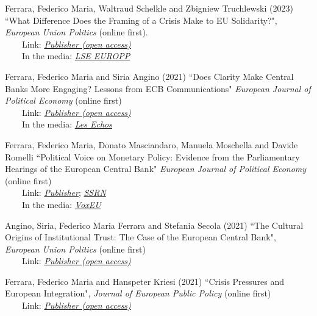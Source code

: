\documentclass[margin, line]{res}
\begin{document}
\begin{resume}
Ferrara, Federico Maria, Waltraud Schelkle and Zbigniew Truchlewski (2023) ``What Difference Does the Framing of a Crisis Make to EU Solidarity?", \textit{European Union Politics} (online first). \\ \-\ \-\ \-\ \-\ Link: \href{https://journals.sagepub.com/doi/full/10.1177/14651165231184641}{\textit{Publisher (open access)}} \\  \-\ \-\ \-\  \-\ In the media: \href{https://blogs.lse.ac.uk/europpblog/2023/09/07/whats-in-a-crisis-how-frames-change-citizens-support-for-solidarity}{\textit{LSE EUROPP}}

Ferrara, Federico Maria and Siria Angino (2021) ``Does Clarity Make Central Banks More Engaging? Lessons from ECB Communications" \textit{European Journal of Political Economy} (online first) \\ \-\ \-\ \-\ \-\ Link: \href{https://www.sciencedirect.com/science/article/pii/S0176268021001191}{\textit{Publisher (open access)}}\\ \-\ \-\ \-\  \-\ In the media: \href{https://www.lesechos.fr/finance-marches/marches-financiers/la-bce-prise-au-mot-par-les-marches-1371644" target="_blank}{\textit{Les Echos}}

Ferrara, Federico Maria, Donato Masciandaro, Manuela Moschella and Davide Romelli ``Political Voice on Monetary Policy: Evidence from the Parliamentary Hearings of the European Central Bank" \textit{European Journal of Political Economy} (online first)\\ \-\ \-\ \-\ \-\ Link: \href{https://www.sciencedirect.com/science/article/abs/pii/S0176268021001178?dgcid=rss_sd_all}{\textit{Publisher}}; \href{https://papers.ssrn.com/sol3/papers.cfm?abstract_id=3820745}{\textit{SSRN}}\\ \-\ \-\ \-\  \-\ In the media: \href{https://voxeu.org/article/parliamentary-voice-ecb-monetary-policy}{\textit{VoxEU}}

Angino, Siria, Federico Maria Ferrara and Stefania Secola (2021) ``The Cultural Origins of Institutional Trust: The Case of the European Central Bank", \textit{European Union Politics} (online first)\\ \-\ \-\ \-\ \-\ Link: \href{https://journals.sagepub.com/doi/10.1177/14651165211048325}{\textit{Publisher (open access)}}

Ferrara, Federico Maria and Hanspeter Kriesi (2021) ``Crisis Pressures and European Integration", \textit{Journal of European Public Policy} (online first)\\  \-\ \-\ \-\ \-\ Link: \href{https://www.tandfonline.com/doi/full/10.1080/13501763.2021.1966079}{\textit{Publisher (open access)}}


\end{resume}
\end{document}
